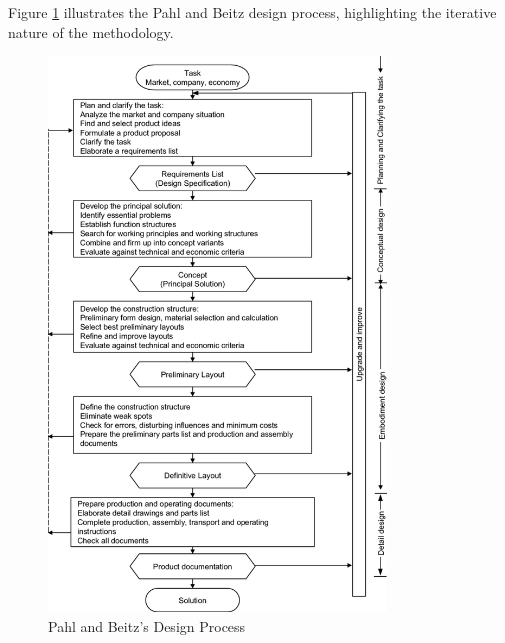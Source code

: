 Figure \ref{fig:pahlprocess} illustrates the Pahl and Beitz design process, highlighting the iterative nature of the methodology.


\begin{figure}[ht!]
    \centering
    \includegraphics[width=0.8\textwidth]{texs/Part1/chapter1/image/pahlprocess.png}
    \caption{Pahl and Beitz's Design Process \cite{Pahl07l}}
    \label{fig:pahlprocess}
\end{figure}

